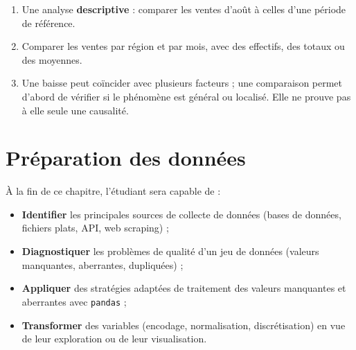 \documentclass[
  french,
  letterpaper,
  open=any]{scrbook}
\providecommand{\tightlist}{%
  \setlength{\itemsep}{0pt}\setlength{\parskip}{0pt}}
\theoremstyle{definition}
\theoremstyle{definition}
\theoremstyle{remark}
\begin{document}
\begin{tcolorbox}[enhanced jigsaw, arc=.35mm, bottomrule=.15mm, bottomtitle=1mm, breakable, colback=white, colbacktitle=quarto-callout-tip-color!10!white, colframe=quarto-callout-tip-color-frame, coltitle=black, left=2mm, leftrule=.75mm, opacityback=0, opacitybacktitle=0.6, rightrule=.15mm, title=\textcolor{quarto-callout-tip-color}{\faLightbulb}\hspace{0.5em}{Solution de l'exercice Exercice~\ref{exr-intro-ad-8}}, titlerule=0mm, toprule=.15mm, toptitle=1mm]

\begin{enumerate}
\def\labelenumi{\alph{enumi}.}
\tightlist
\item
  Une analyse \textbf{descriptive} : comparer les ventes d'août à celles
  d'une période de référence.
\item
  Comparer les ventes par région et par mois, avec des effectifs, des
  totaux ou des moyennes.
\item
  Une baisse peut coïncider avec plusieurs facteurs ; une comparaison
  permet d'abord de vérifier si le phénomène est général ou localisé.
  Elle ne prouve pas à elle seule une causalité.
\end{enumerate}

\end{tcolorbox}


\chapter{Préparation des données}\label{pruxe9paration-des-donnuxe9es}

\begin{tcolorbox}[enhanced jigsaw, arc=.35mm, bottomrule=.15mm, bottomtitle=1mm, breakable, colback=white, colbacktitle=quarto-callout-tip-color!10!white, colframe=quarto-callout-tip-color-frame, coltitle=black, left=2mm, leftrule=.75mm, opacityback=0, opacitybacktitle=0.6, rightrule=.15mm, title=\textcolor{quarto-callout-tip-color}{\faLightbulb}\hspace{0.5em}{Objectifs du chapitre}, titlerule=0mm, toprule=.15mm, toptitle=1mm]

À la fin de ce chapitre, l'étudiant sera capable de :

\begin{itemize}
\tightlist
\item
  \textbf{Identifier} les principales sources de collecte de données
  (bases de données, fichiers plats, API, web scraping) ;
\item
  \textbf{Diagnostiquer} les problèmes de qualité d'un jeu de données
  (valeurs manquantes, aberrantes, dupliquées) ;
\item
  \textbf{Appliquer} des stratégies adaptées de traitement des valeurs
  manquantes et aberrantes avec \texttt{pandas} ;
\item
  \textbf{Transformer} des variables (encodage, normalisation,
  discrétisation) en vue de leur exploration ou de leur visualisation.
\end{itemize}

\end{tcolorbox}
\end{document}
